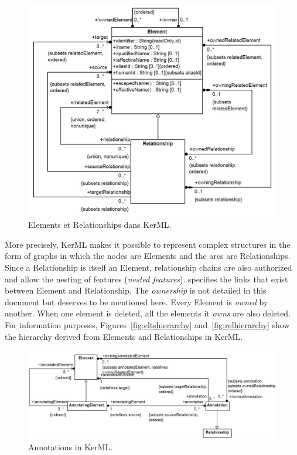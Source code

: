 \begin{figure}[ht]     
	\centering
	\includegraphics[width=.8\linewidth]{images/elementrelationship.jpg}
	\caption{Elements et Relationships dans KerML.}
	\label{fig:eltrel}
\end{figure}
More precisely, KerML makes it possible to represent complex structures in the form of graphs in which the nodes are Elements and the arcs are Relationships. Since a Relationship is itself an Element, relationship chains are also authorized and allow the nesting of features (\textit{nested features}).  specifies the links that exist between Element and Relationship. The \textit{ownership} is not detailed in this document but deserves to be mentioned here. Every Element is \textit{owned} by another. When one element is deleted, all the elements it \textit{owns} are also deleted.
For information purposes, Figures~\ref{fig:eltshierarchy} and~\ref{fig:relhierarchy} show the hierarchy derived from Elements and Relationships in KerML.

\begin{figure}[ht]     
	\centering
	\includegraphics[width=.99\linewidth]{images/annotations.JPG}
	\caption{Annotations in KerML.}
	\label{fig:annot}
\end{figure}

